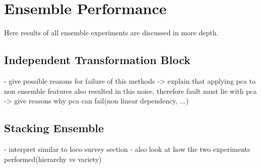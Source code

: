 \section{Ensemble Performance}
\label{sec:ensemblediscussion}

Here results of all ensemble experiments are discussed in more depth. 

\subsection{Independent Transformation Block}
\label{subsec:ITBfaildiscussion}

- give possible reasons for failure of this methods\newline
-> explain that applying pca to non ensemble features also resulted in this noise, therefore fault must lie with pca\newline
-> give reasons why pca can fail(non linear dependency, ...)\newline


\subsection{Stacking Ensemble}
\label{subsec:stackingdiscussion}

- interpret similar to loco survey section\newline
- also look at how the two experiments performed(hierarchy vs variety)\newline




